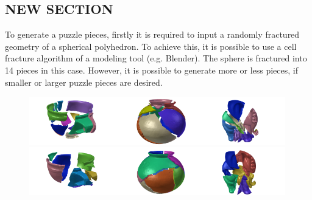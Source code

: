 \documentclass[acmlarge,screen]{acmart}
\begin{document}
\subsection{NEW SECTION}
To generate a puzzle pieces, firstly it is required to input a randomly fractured geometry of a spherical polyhedron. To achieve this, it is possible to use a cell fracture algorithm of a modeling tool (e.g. Blender). The sphere is fractured into 14 pieces in this case. However, it is possible to generate more or less pieces, if smaller or larger puzzle pieces are desired. 


\begin{figure}[h]
\includegraphics[width=0.33\textwidth]{images/ambercuppuzzle0}\includegraphics[width=0.33\textwidth]{images/saltdeanpuzzle0}\includegraphics[width=0.33\textwidth]{images/elephantpuzzle0}\\
\includegraphics[width=0.33\textwidth]{images/ambercuppuzzle2}\includegraphics[width=0.33\textwidth]{images/saltdeanpuzzle1}\includegraphics[width=0.33\textwidth]{images/elephantpuzzle1}\\

\end{figure}
\end{document}
